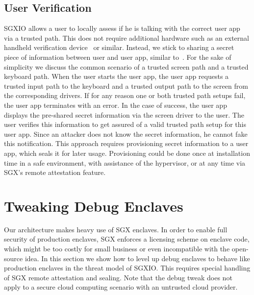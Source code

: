 \documentclass{sig-alternate-05-2015}
\begin{document}
\subsection{User Verification}\label{sec:user_verify}
SGXIO allows a user to locally assess if he is talking with the correct user app via a trusted path. 
This does not require additional hardware such as an external handheld verification device~\cite{zhou_building_2012} or similar. 
Instead, we stick to sharing a secret piece of information between user and user app, similar to~\cite{verifiedbyvisa}. 
For the sake of simplicity we discuss the common scenario of a trusted screen path and a trusted keyboard path. 
When the user starts the user app, the user app requests a trusted input path to the keyboard and a trusted output path to the screen from the corresponding drivers. 
If for any reason one or both trusted path setups fail, the user app terminates with an error. 
In the case of success, the user app displays the pre-shared secret information via the screen driver to the user. 
The user verifies this information to get assured of a valid trusted path setup for this user app. 
Since an attacker does not know the secret information, he cannot fake this notification.
This approach requires provisioning secret information to a user app, which seals it for later usage. 
Provisioning could be done once at installation time in a safe environment, \eg with assistance of the hypervisor, or at any time via SGX's remote attestation feature. 




\section{Tweaking Debug Enclaves}\label{sec:sgx_debug}
Our architecture makes heavy use of SGX enclaves. 
In order to enable full security of production enclaves, SGX enforces a licensing scheme on enclave code, which might be too costly for small business or even incompatible with the open-source idea. 
In this section we show how to level up debug enclaves to behave like production enclaves in the threat model of SGXIO. 
This requires special handling of SGX remote attestation and sealing. 
Note that the debug tweak does not apply to a secure cloud computing scenario with an untrusted cloud provider. 
\end{document}
